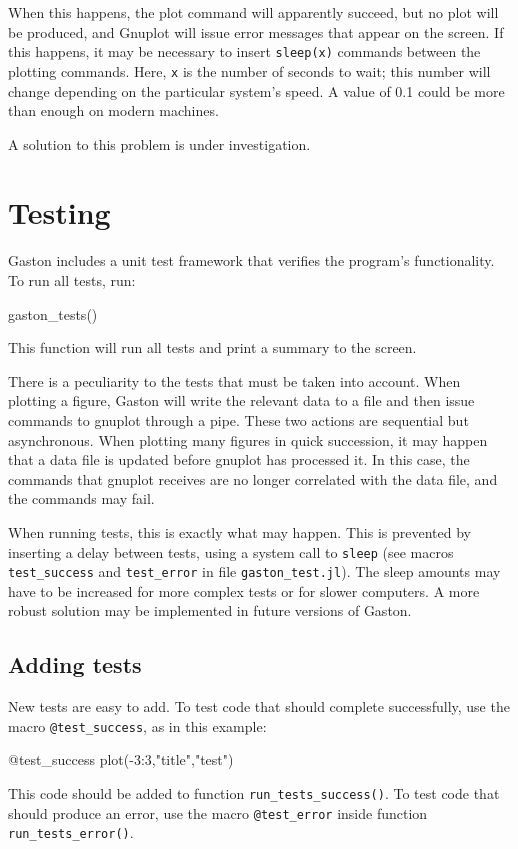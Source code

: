 \documentclass[11pt]{article}
\newcommand{\cmd}[1]{\texttt{#1}}
\begin{document}
When this happens, the plot command will apparently succeed, but no plot will
be produced, and Gnuplot will issue error messages that appear on the screen.
If this happens, it may be necessary to insert \cmd{sleep(x)} commands between
the plotting commands. Here, \cmd{x} is the number of seconds to wait; this
number will change depending on the particular system's speed. A value
of 0.1 could be more than enough on modern machines.

A solution to this problem is under investigation.

\section{Testing}
\label{tests}

Gaston includes a unit test framework that verifies the program's
functionality. To run all tests, run:
\begin{juliacode}
gaston_tests()
\end{juliacode}
This function will run all tests and print a summary to the screen.

There is a peculiarity to the tests that must be taken into account. When
plotting a figure, Gaston will write the relevant data to a file and then issue
commands to gnuplot through a pipe. These two actions are sequential but
asynchronous. When plotting many figures in quick succession, it may happen
that a data file is updated before gnuplot has processed it. In this case, the
commands that gnuplot receives are no longer correlated with the data file, and
the commands may fail.

When running tests, this is exactly what may happen. This is prevented by
inserting a delay between tests, using a system call to \cmd{sleep} (see macros
\cmd{test\_success} and \cmd{test\_error} in file \cmd{gaston\_test.jl}). The
sleep amounts may have to be increased for more complex tests or for slower
computers.  A more robust solution may be implemented in future versions of
Gaston.

\subsection{Adding tests}

New tests are easy to add. To test code that should complete successfully,
use the macro \cmd{@test\_success}, as in this example:
\begin{juliacode}
@test_success plot(-3:3,"title","test")
\end{juliacode}
This code should be added to function \cmd{run\_tests\_success()}. To test code
that should produce an error, use the macro \cmd{@test\_error} inside function
\cmd{run\_tests\_error()}.
\end{document}
